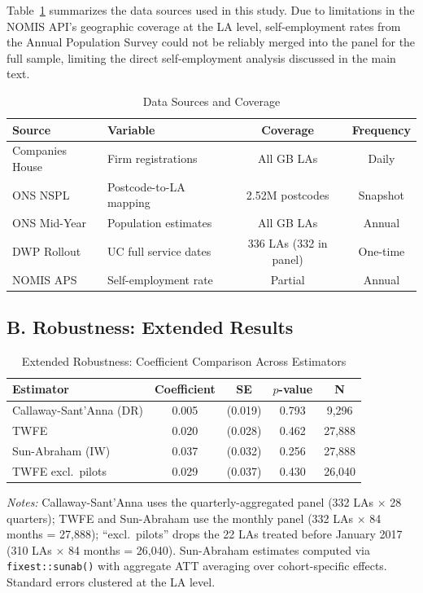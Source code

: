 \documentclass[12pt]{article}
\begin{document}
Table~\ref{tab:data_coverage} summarizes the data sources used in this study. Due to limitations in the NOMIS API's geographic coverage at the LA level, self-employment rates from the Annual Population Survey could not be reliably merged into the panel for the full sample, limiting the direct self-employment analysis discussed in the main text.

\begin{table}[H]
\centering
\caption{Data Sources and Coverage}
\label{tab:data_coverage}
\begin{tabular}{llcc}
\toprule
Source & Variable & Coverage & Frequency \\
\midrule
Companies House & Firm registrations & All GB LAs & Daily \\
ONS NSPL & Postcode-to-LA mapping & 2.52M postcodes & Snapshot \\
ONS Mid-Year & Population estimates & All GB LAs & Annual \\
DWP Rollout & UC full service dates & 336 LAs (332 in panel) & One-time \\
NOMIS APS & Self-employment rate & Partial & Annual \\
\bottomrule
\end{tabular}
\end{table}

\subsection*{B. Robustness: Extended Results}

\begin{table}[H]
\centering
\caption{Extended Robustness: Coefficient Comparison Across Estimators}
\label{tab:extended_robust}
\begin{threeparttable}
\begin{tabular}{lcccc}
\toprule
Estimator & Coefficient & SE & $p$-value & N \\
\midrule
Callaway-Sant'Anna (DR) & 0.005 & (0.019) & 0.793 & 9,296 \\
TWFE & 0.020 & (0.028) & 0.462 & 27,888 \\
Sun-Abraham (IW) & 0.037 & (0.032) & 0.256 & 27,888 \\
TWFE excl.\ pilots & 0.029 & (0.037) & 0.430 & 26,040 \\
\bottomrule
\end{tabular}
\begin{tablenotes}
\small
\item \textit{Notes:} Callaway-Sant'Anna uses the quarterly-aggregated panel (332 LAs $\times$ 28 quarters); TWFE and Sun-Abraham use the monthly panel (332 LAs $\times$ 84 months = 27,888); ``excl.\ pilots'' drops the 22 LAs treated before January 2017 (310 LAs $\times$ 84 months = 26,040). Sun-Abraham estimates computed via \texttt{fixest::sunab()} with aggregate ATT averaging over cohort-specific effects. Standard errors clustered at the LA level.
\end{tablenotes}
\end{threeparttable}
\end{table}
\end{document}
